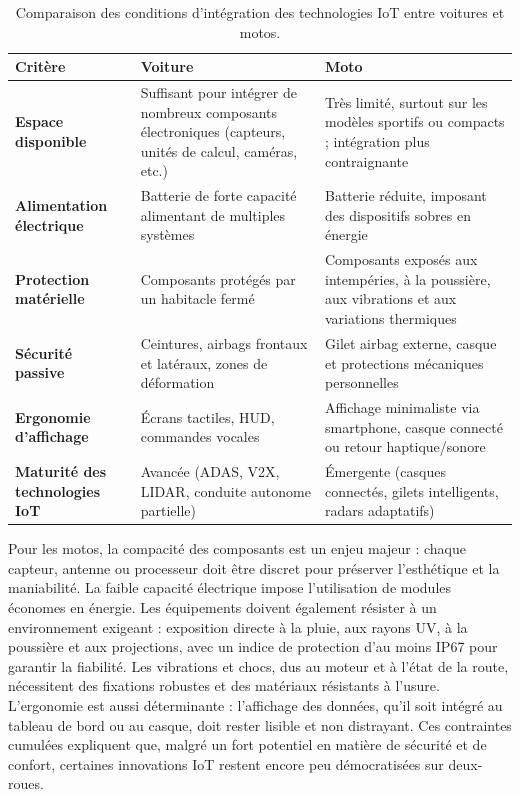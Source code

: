 \begin{table}[H]
\centering
\label{tab:comparaison_iot_voiture_moto}
\renewcommand{\arraystretch}{1.15}
\begin{tabular}{|p{3.2cm}|p{6.5cm}|p{6.5cm}|}
\hline
\textbf{Critère} & \textbf{Voiture} & \textbf{Moto} \\
\hline
\textbf{Espace disponible} &
Suffisant pour intégrer de nombreux composants électroniques (capteurs, unités de calcul, caméras, etc.) &
Très limité, surtout sur les modèles sportifs ou compacts ; intégration plus contraignante \\
\hline
\textbf{Alimentation électrique} &
Batterie de forte capacité alimentant de multiples systèmes &
Batterie réduite, imposant des dispositifs sobres en énergie \\
\hline
\textbf{Protection matérielle} &
Composants protégés par un habitacle fermé &
Composants exposés aux intempéries, à la poussière, aux vibrations et aux variations thermiques \\
\hline
\textbf{Sécurité passive} &
Ceintures, airbags frontaux et latéraux, zones de déformation &
Gilet airbag externe, casque et protections mécaniques personnelles \\
\hline
\textbf{Ergonomie d’affichage} &
Écrans tactiles, HUD, commandes vocales &
Affichage minimaliste via smartphone, casque connecté ou retour haptique/sonore \\
\hline
\textbf{Maturité des technologies IoT} &
Avancée (ADAS, V2X, LIDAR, conduite autonome partielle) &
Émergente (casques connectés, gilets intelligents, radars adaptatifs) \\
\hline
\end{tabular}
\caption{Comparaison des conditions d’intégration des technologies IoT entre voitures et motos.}
\end{table}

Pour les motos, la compacité des composants est un enjeu majeur : chaque capteur, antenne ou processeur doit être discret pour préserver l’esthétique et la maniabilité. La faible capacité électrique impose l’utilisation de modules économes en énergie. Les équipements doivent également résister à un environnement exigeant : exposition directe à la pluie, aux rayons UV, à la poussière et aux projections, avec un indice de protection d’au moins IP67 pour garantir la fiabilité.
Les vibrations et chocs, dus au moteur et à l’état de la route, nécessitent des fixations robustes et des matériaux résistants à l’usure. L’ergonomie est aussi déterminante : l’affichage des données, qu’il soit intégré au tableau de bord ou au casque, doit rester lisible et non distrayant. Ces contraintes cumulées expliquent que, malgré un fort potentiel en matière de sécurité et de confort, certaines innovations IoT restent encore peu démocratisées sur deux-roues.


